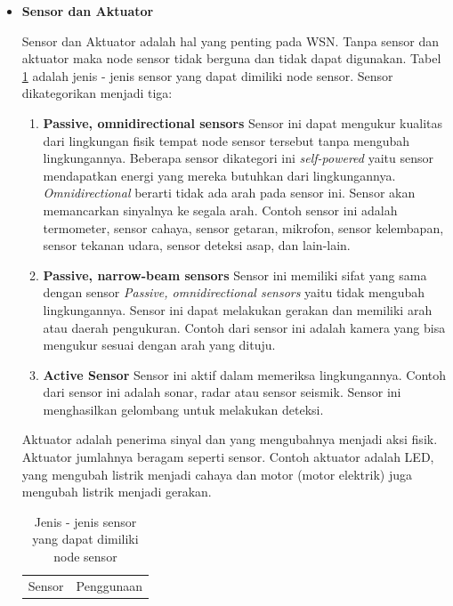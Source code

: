 \documentclass[a4paper,twoside]{article}
\begin{document}
\begin{enumerate}
\begin{itemize}
\item \textbf{Sensor dan Aktuator}

Sensor dan Aktuator adalah hal yang penting pada WSN. Tanpa sensor dan aktuator maka node sensor tidak berguna dan tidak dapat digunakan. Tabel \ref{tab:sensor} adalah jenis - jenis sensor yang dapat dimiliki node sensor. Sensor dikategorikan menjadi tiga:
\begin{enumerate}
	\item \textbf{Passive, omnidirectional sensors} Sensor ini dapat mengukur kualitas dari lingkungan fisik tempat node sensor tersebut tanpa mengubah lingkungannya. Beberapa sensor dikategori ini \textit{self-powered} yaitu sensor mendapatkan energi yang mereka butuhkan dari lingkungannya. \textit{Omnidirectional} berarti tidak ada arah pada sensor ini. Sensor akan memancarkan sinyalnya ke segala arah. Contoh sensor ini adalah termometer, sensor cahaya, sensor getaran, mikrofon, sensor kelembapan, sensor tekanan udara, sensor deteksi asap, dan lain-lain.
	\item \textbf{Passive, narrow-beam sensors} Sensor ini memiliki sifat yang sama dengan sensor \textit{Passive, omnidirectional sensors} yaitu tidak mengubah lingkungannya. Sensor ini dapat melakukan gerakan dan memiliki arah atau daerah pengukuran. Contoh dari sensor ini adalah kamera yang bisa mengukur sesuai dengan arah yang dituju.
	\item \textbf{Active Sensor} Sensor ini aktif dalam memeriksa lingkungannya. Contoh dari sensor ini adalah sonar, radar atau sensor seismik. Sensor ini menghasilkan gelombang untuk melakukan deteksi.
\end{enumerate}

Aktuator adalah penerima sinyal dan yang mengubahnya menjadi aksi fisik. Aktuator jumlahnya beragam seperti sensor.  Contoh aktuator adalah LED, yang mengubah listrik menjadi cahaya dan motor (motor elektrik) juga mengubah listrik menjadi gerakan.

\begin{table} [H]
	\centering 
	\caption{Jenis - jenis sensor yang dapat dimiliki node sensor}
	\label{tab:sensor}
	\begin{tabular}{|p{5.5cm}|p{7cm}|}
		\toprule
		Sensor & Penggunaan\\


\end{tabular}
\end{table}
\end{itemize}
\end{enumerate}
\end{document}
